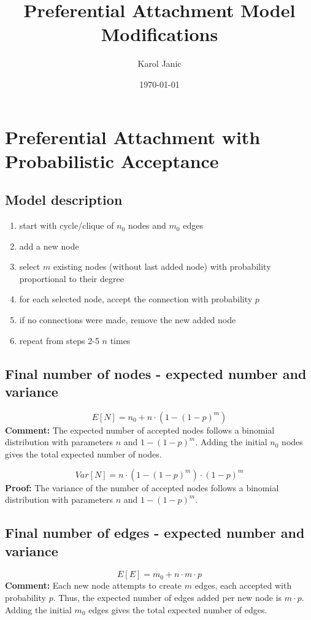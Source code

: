 \documentclass{article}
\title{Preferential Attachment Model Modifications}
\author{Karol Janic}
\date{\today}
\begin{document}
\maketitle

\section*{Preferential Attachment with Probabilistic Acceptance}

\subsection*{Model description}
\begin{enumerate}
    \item start with cycle/clique of $n_0$ nodes and $m_0$ edges
    \item add a new node
    \item select $m$ existing nodes (without last added node) with probability proportional to their degree
    \item for each selected node, accept the connection with probability $p$
    \item if no connections were made, remove the new added node
    \item repeat from steps 2-5 $n$ times
\end{enumerate}

\subsection*{Final number of nodes - expected number and variance}
\begin{equation}
    E[N] = n_0 + n \cdot (1 - (1 - p)^m)
\end{equation}
\textbf{Comment:} The expected number of accepted nodes follows a binomial distribution with parameters $n$ and $1 - (1 - p)^m$. 
Adding the initial $n_0$ nodes gives the total expected number of nodes.

\begin{equation}
    Var[N] = n \cdot (1 - (1 - p)^m) \cdot (1 - p)^m
\end{equation}
\textbf{Proof:} The variance of the number of accepted nodes follows a binomial distribution with parameters $n$ and $1 - (1 - p)^m$.

\subsection*{Final number of edges - expected number and variance}
\begin{equation}
    E[E] = m_0 + n \cdot m \cdot p
\end{equation}
\textbf{Comment:} Each new node attempts to create $m$ edges, each accepted with probability $p$. Thus, the expected number of edges added per new node is $m \cdot p$. Adding the initial $m_0$ edges gives the total expected number of edges.
\end{document}
